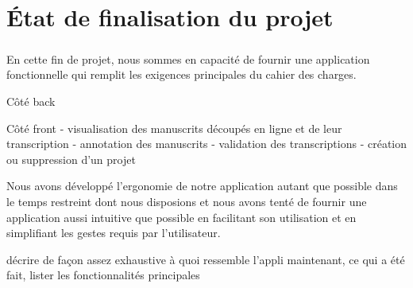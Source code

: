 \chapter{État de finalisation du projet}

\paragraph{}
En cette fin de projet, nous sommes en capacité de fournir une application fonctionnelle qui remplit les exigences principales du cahier des charges.

Côté back

Côté front
- visualisation des manuscrits découpés en ligne et de leur transcription
- annotation des manuscrits
- validation des transcriptions
- création ou suppression d'un projet

Nous avons développé l'ergonomie de notre application autant que possible dans le temps restreint dont nous disposions et nous avons tenté de fournir une application aussi intuitive que possible en facilitant son utilisation et en simplifiant les gestes requis par l'utilisateur.



décrire de façon assez exhaustive à quoi ressemble l'appli maintenant, ce qui a été fait, lister les fonctionnalités principales